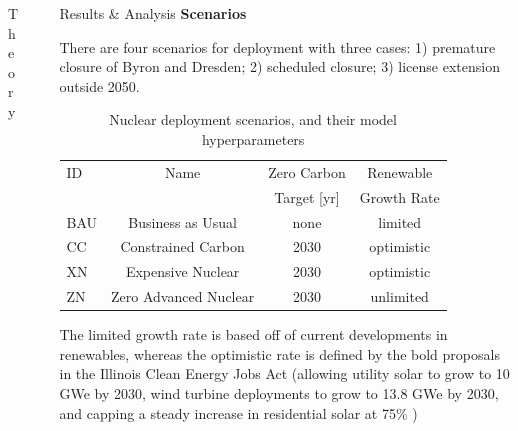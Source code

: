 \documentclass[final]{beamer}
\newlength{\sepwid}
\newlength{\onecolwid}
\newlength{\threecolwid}
\begin{document}
\begin{frame}[t]
\begin{columns}[t,totalwidth=\threecolwid]
\begin{column}{\onecolwid}
\begin{block}{Theory}
\end{block}



\end{column} %

\begin{column}{\sepwid}\end{column} %



\begin{column}{\onecolwid} %

\begin{block}{Results \& Analysis}
\vspace{0.7em}
\textbf{Scenarios}
\vspace{0.7em}

There are four scenarios for deployment with three cases: 1) premature closure of Byron and Dresden; 2) scheduled closure; 3) license extension outside 2050. 
\begin{table}[]
	\label{tab:scenarios}
	\caption{Nuclear deployment scenarios, and their model hyperparameters \cite{dotson}}
	\begin{tabular}{lccc}
	\hline
	ID  &  Name  &  Zero Carbon  &  Renewable \\  
	& & Target [yr] & Growth Rate\\ \hline
	BAU & Business as Usual     & none & limited \\ 
	CC  & Constrained Carbon    & 2030 & optimistic\\ 
	XN  & Expensive Nuclear     & 2030 & optimistic \\
	ZN  & Zero Advanced Nuclear & 2030 & unlimited \\ \hline
	\end{tabular}
\end{table}
The limited growth rate is based off of current developments in renewables, whereas the optimistic rate is defined by the bold proposals in the Illinois Clean Energy Jobs Act (allowing utility solar to grow to 10 GWe by 2030, wind turbine deployments to grow to 13.8 GWe by 2030, and capping a steady increase in residential solar at 75\% \cite{gagnon_rooftop_2016}) 


\end{block}
\end{column}
\end{columns}
\end{frame}
\end{document}
